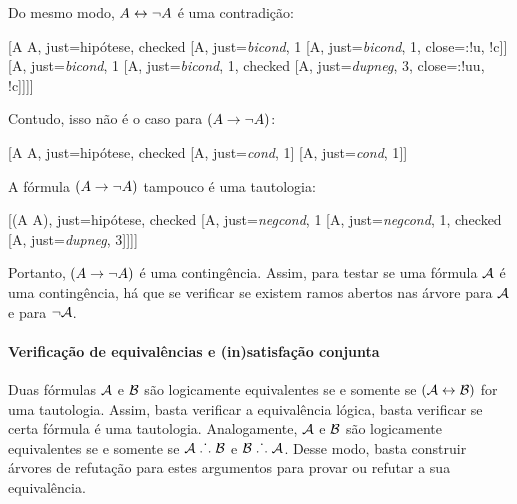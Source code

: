 Do mesmo modo,  $A \leftrightarrow \neg A$ é uma contradição:

\begin{center}
	\begin{tableau}
		{
		}
		[A \eiff \enot A, just=hipótese, checked
			[A, just={\emph{bicond}, 1}
				[\enot A, just={\emph{bicond}, 1}, close={:!u, !c}]]
			[\enot A, just={\emph{bicond}, 1}
				[\enot \enot A, just={\emph{bicond}, 1}, checked
				[A, just={\emph{dupneg}, 3}, close={:!uu, !c}]]]]
	\end{tableau}
\end{center}

Contudo, isso não é o caso para $(A \rightarrow \neg A)$:

\begin{center}
	\begin{tableau}
		{
		}
		[A \eif \enot A, just=hipótese, checked
		[A, just={\emph{cond}, 1}]
		[\enot A, just={\emph{cond}, 1}]]
	\end{tableau}
\end{center}

A fórmula $(A \rightarrow \neg A)$ tampouco é uma tautologia:

	\begin{center}
	\begin{tableau}
		{
		}
		[\enot(A \eif \enot A), just=hipótese, checked
		[A, just={\emph{negcond}, 1}
		[\enot \enot A, just={\emph{negcond}, 1}, checked
		[A, just={\emph{dupneg}, 3}]]]]
	\end{tableau}
\end{center}

Portanto, $(A \rightarrow \neg A)$ é uma contingência. 
Assim, para testar se uma fórmula $\mathcal{A}$ é uma contingência, há que se verificar se existem ramos abertos nas árvore para $\mathcal{A}$ e para $\neg\mathcal{A}$.

\paragraph{Verificação de equivalências e (in)satisfação conjunta}

Duas fórmulas $\mathcal{A}$ e $\mathcal{B}$ são logicamente equivalentes se e somente se $(\mathcal{A} \leftrightarrow \mathcal{B})$ for uma tautologia. 
Assim, basta verificar a equivalência lógica, basta verificar se certa fórmula é uma tautologia.
Analogamente,  $\mathcal{A}$ e $\mathcal{B}$ são logicamente equivalentes se e somente se $\mathcal{A} \mathrel{\ldotp\dot{}\,\ldotp} \mathcal{B}$ e $\mathcal{B} \mathrel{\ldotp\dot{}\,\ldotp} \mathcal{A}$.
Desse modo, basta construir árvores de refutação para estes argumentos para provar ou refutar a sua equivalência.

